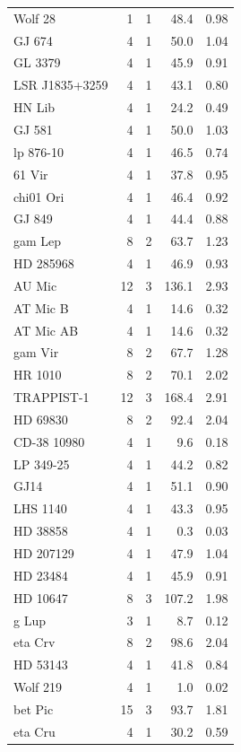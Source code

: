 \documentclass{openjournal}
\begin{document}
\begin{table}
\begin{tabular}{@{}lrrrr@{}}
Wolf   28 & 1 & 1 & 48.4 & 0.98 \\
GJ 674 & 4 & 1 & 50.0 & 1.04 \\
GL 3379 & 4 & 1 & 45.9 & 0.91 \\
LSR J1835+3259 & 4 & 1 & 43.1 & 0.80 \\
HN Lib & 4 & 1 & 24.2 & 0.49 \\
GJ 581 & 4 & 1 & 50.0 & 1.03 \\
lp 876-10 & 4 & 1 & 46.5 & 0.74 \\
61 Vir & 4 & 1 & 37.8 & 0.95 \\
chi01 Ori & 4 & 1 & 46.4 & 0.92 \\
GJ 849 & 4 & 1 & 44.4 & 0.88 \\
gam Lep & 8 & 2 & 63.7 & 1.23 \\
HD 285968 & 4 & 1 & 46.9 & 0.93 \\
AU Mic & 12 & 3 & 136.1 & 2.93 \\
AT Mic B & 4 & 1 & 14.6 & 0.32 \\
AT Mic AB & 4 & 1 & 14.6 & 0.32 \\
gam Vir & 8 & 2 & 67.7 & 1.28 \\
HR 1010 & 8 & 2 & 70.1 & 2.02 \\
TRAPPIST-1 & 12 & 3 & 168.4 & 2.91 \\
HD 69830 & 8 & 2 & 92.4 & 2.04 \\
CD-38 10980 & 4 & 1 & 9.6 & 0.18 \\
LP  349-25 & 4 & 1 & 44.2 & 0.82 \\
GJ14 & 4 & 1 & 51.1 & 0.90 \\
LHS 1140 & 4 & 1 & 43.3 & 0.95 \\
HD 38858 & 4 & 1 & 0.3 & 0.03 \\
HD 207129 & 4 & 1 & 47.9 & 1.04 \\
HD 23484 & 4 & 1 & 45.9 & 0.91 \\
HD 10647 & 8 & 3 & 107.2 & 1.98 \\
g Lup & 3 & 1 & 8.7 & 0.12 \\
eta Crv & 8 & 2 & 98.6 & 2.04 \\
HD 53143 & 4 & 1 & 41.8 & 0.84 \\
Wolf  219 & 4 & 1 & 1.0 & 0.02 \\
bet Pic & 15 & 3 & 93.7 & 1.81 \\
eta Cru & 4 & 1 & 30.2 & 0.59 \\
\hline
\end{tabular}
\end{table}
\end{document}
